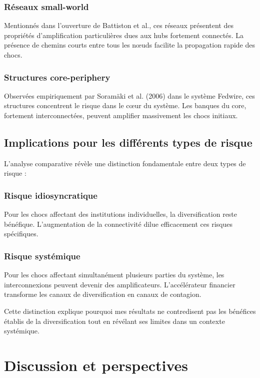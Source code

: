 \documentclass[12pt,a4paper,twoside]{article}
\begin{document}
\subsubsection{Réseaux small-world}

Mentionnés dans l'ouverture de Battiston et al., ces réseaux présentent des propriétés d'amplification particulières dues aux hubs fortement connectés. La présence de chemins courts entre tous les nœuds facilite la propagation rapide des chocs.

\subsubsection{Structures core-periphery}

Observées empiriquement par Soramäki et al. (2006) dans le système Fedwire, ces structures concentrent le risque dans le cœur du système. Les banques du core, fortement interconnectées, peuvent amplifier massivement les chocs initiaux.

\subsection{Implications pour les différents types de risque}

L'analyse comparative révèle une distinction fondamentale entre deux types de risque :

\subsubsection{Risque idiosyncratique}

Pour les chocs affectant des institutions individuelles, la diversification reste bénéfique. L'augmentation de la connectivité dilue efficacement ces risques spécifiques.

\subsubsection{Risque systémique}

Pour les chocs affectant simultanément plusieurs parties du système, les interconnexions peuvent devenir des amplificateurs. L'accélérateur financier transforme les canaux de diversification en canaux de contagion.

Cette distinction explique pourquoi mes résultats ne contredisent pas les bénéfices établis de la diversification tout en révélant ses limites dans un contexte systémique.

\section{Discussion et perspectives}
\end{document}
